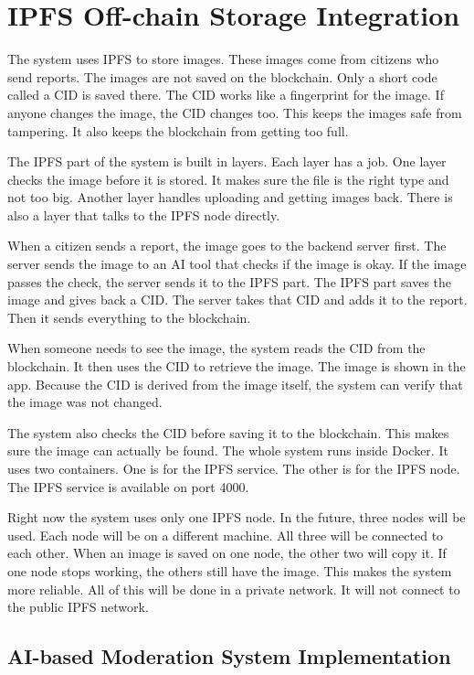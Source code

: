 \section{IPFS Off-chain Storage Integration}


The system uses IPFS to store images. These images come from citizens who send reports. The images are not saved on the blockchain. Only a short code called a CID is saved there. The CID works like a fingerprint for the image. If anyone changes the image, the CID changes too. This keeps the images safe from tampering. It also keeps the blockchain from getting too full.

The IPFS part of the system is built in layers. Each layer has a job. One layer checks the image before it is stored. It makes sure the file is the right type and not too big. Another layer handles uploading and getting images back. There is also a layer that talks to the IPFS node directly.

When a citizen sends a report, the image goes to the backend server first. The server sends the image to an AI tool that checks if the image is okay. If the image passes the check, the server sends it to the IPFS part. The IPFS part saves the image and gives back a CID. The server takes that CID and adds it to the report. Then it sends everything to the blockchain.

When someone needs to see the image, the system reads the CID from the blockchain. It then uses the CID to retrieve the image. The image is shown in the app. Because the CID is derived from the image itself, the system can verify that the image was not changed.

The system also checks the CID before saving it to the blockchain. This makes sure the image can actually be found. The whole system runs inside Docker. It uses two containers. One is for the IPFS service. The other is for the IPFS node. The IPFS service is available on port 4000.

Right now the system uses only one IPFS node. In the future, three nodes will be used. Each node will be on a different machine. All three will be connected to each other. When an image is saved on one node, the other two will copy it. If one node stops working, the others still have the image. This makes the system more reliable. All of this will be done in a private network. It will not connect to the public IPFS network.


\subsection{AI-based Moderation System Implementation}


